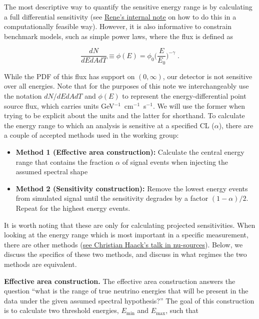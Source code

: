 \documentclass[a4paper,11pt]{article}
\begin{document}
The most descriptive way to quantify the sensitive energy range is by calculating a full differential sensitivity (see \href{https://internal-apps.icecube.wisc.edu/reports/details.php?type=report&id=icecube\%2F201910002}{Rene's internal note} on how to do this in a computationally feasible way). However, it is also informative to constrain benchmark models, such as simple power laws, where the flux is defined as 

\begin{equation}
     \frac{dN}{dEdAdT} \equiv \phi(E) = \phi_0 \Big(\frac{E}{E_0}\Big)^{-\gamma} \; .
\end{equation}

While the PDF of this flux has support on $(0, \infty)$, our detector is not sensitive over all energies. Note that for the purposes of this note we interchangeably use the notation $dN\big/dEdAdT$ and $\phi(E)$ to represent the energy-differential point source flux, which carries units GeV$^{-1}$~cm$^{-1}$~s$^{-1}$. We will use the former when trying to be explicit about the units and the latter for shorthand. To calculate the energy range to which an analysis is sensitive at a specified CL ($\alpha$), there are a couple of accepted methods used in the working group:

\begin{itemize}
    \item \textbf{Method 1 (Effective area construction):} Calculate the central energy range that contains the fraction $\alpha$ of signal events when injecting the assumed spectral shape
    \item \textbf{Method 2 (Sensitivity construction):} Remove the lowest energy events from simulated signal until the sensitivity degrades by a factor $(1-\alpha)/2$. Repeat for the highest energy events.
\end{itemize}

It is worth noting that these are only for calculating projected sensitivities. When looking at the energy range which is most important in a specific measurement, there are other methods (\href{https://drive.google.com/file/d/1UVBMbMJwyqDicMsBtyAmF3kLzf-pcnSS/view}{see Christian Haack's talk in nu-sources}). Below, we discuss the specifics of these two methods, and discuss in what regimes the two methods are equivalent.

\textbf{Effective area construction.} The effective area construction answers the question ``what is the range of true neutrino energies that will be present in the data under the given assumed spectral hypothesis?'' The goal of this construction is to calculate two threshold energies, $E_{\mathrm{min}}$ and $E_{\mathrm{max}}$, such that 
\end{document}
